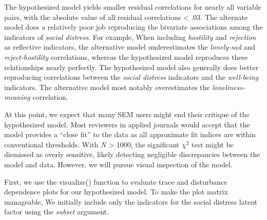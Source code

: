 \documentclass[
  english,
  doc]{apa6}
\begin{document}
The hypothesized model yields smaller residual correlations for nearly all variable pairs, with the absolute value of all residual correlations \textless{} .03. The alternate model does a relatively poor job reproducing the bivariate associations among the indicators of \emph{social distress}. For example, When including \emph{hostility} and \emph{rejection} as reflective indicators, the alternative model underestimates the \emph{lonely-sad} and \emph{reject-hostility} correlations, whereas the hypothesized model reproduces these relationships nearly perfectly. The hypothesized model also generally does better reproducing correlations between the \emph{social distress} indicators and the \emph{well-being} indicators. The alternative model most notably overestimates the \emph{loneliness-meaning} correlation.

At this point, we expect that many SEM users might end their critique of the hypothesized model. Most reviewers in applied journals would accept that the model provides a ``close fit'' to the data as all approximate fit indices are within conventional thresholds. With \emph{N} \textgreater{} 1000, the significant \(\chi^2\) test might be dismissed as overly sensitive, likely detecting negligible discrepancies between the model and data. However, we will pursue visual inspection of the model.

First, we use the visualize() function to evaluate trace and disturbance dependence plots for our hypothesized model. To make the plot matrix manageable, We initially include only the indicators for the social distress latent factor using the \emph{subset} argument.
\end{document}
